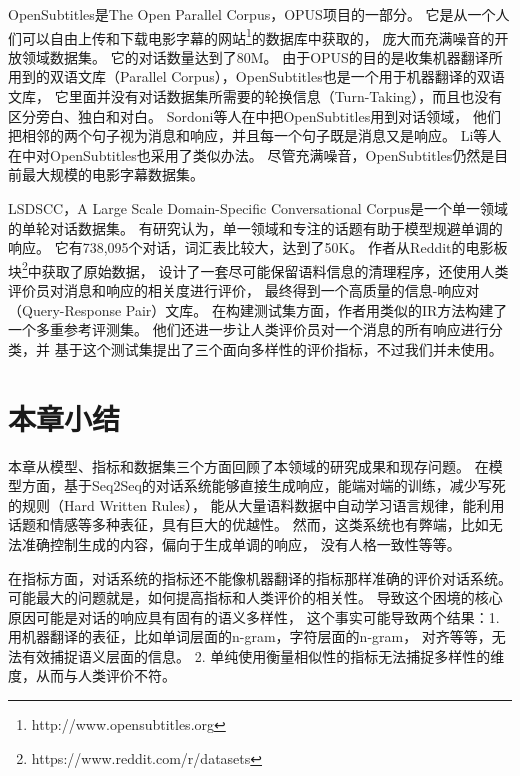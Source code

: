 OpenSubtitles是The Open Parallel Corpus，OPUS项目的一部分。
它是从一个人们可以自由上传和下载电影字幕的网站\footnote{http://www.opensubtitles.org}的数据库中获取的，
庞大而充满噪音的开放领域数据集。
它的对话数量达到了80M。
由于OPUS的目的是收集机器翻译所用到的双语文库（Parallel Corpus），OpenSubtitles也是一个用于机器翻译的双语文库，
它里面并没有对话数据集所需要的轮换信息（Turn-Taking），而且也没有区分旁白、独白和对白。
Sordoni等人在\cite{GoogleChatbot}中把OpenSubtitles用到对话领域，
他们把相邻的两个句子视为消息和响应，并且每一个句子既是消息又是响应。
Li等人在\cite{MMI,persona,Future,DiverseBeam,
Distill,deep_RL,Adversarial}中对OpenSubtitles也采用了类似办法。
尽管充满噪音，OpenSubtitles仍然是目前最大规模的电影字幕数据集。

LSDSCC，A Large Scale Domain-Specific Conversational Corpus是一个单一领域的单轮对话数据集。
有研究认为，单一领域和专注的话题有助于模型规避单调的响应。
它有738,095个对话，词汇表比较大，达到了50K。
作者从Reddit的电影板块\footnote{https://www.reddit.com/r/datasets}中获取了原始数据，
设计了一套尽可能保留语料信息的清理程序，还使用人类评价员对消息和响应的相关度进行评价，
最终得到一个高质量的信息-响应对（Query-Response Pair）文库。
在构建测试集方面，作者用类似\cite{DCGM}的IR方法构建了一个多重参考评测集。
他们还进一步让人类评价员对一个消息的所有响应进行分类，并
基于这个测试集提出了三个面向多样性的评价指标，不过我们并未使用。

\section{本章小结}\label{sec:rw_conclusion}
本章从模型、指标和数据集三个方面回顾了本领域的研究成果和现存问题。
在模型方面，基于Seq2Seq的对话系统能够直接生成响应，能端对端的训练，减少写死的规则（Hard Written Rules），
能从大量语料数据中自动学习语言规律，能利用话题和情感等多种表征，具有巨大的优越性。
然而，这类系统也有弊端，比如无法准确控制生成的内容，偏向于生成单调的响应，
没有人格一致性等等。

在指标方面，对话系统的指标还不能像机器翻译的指标那样准确的评价对话系统。
可能最大的问题就是，如何提高指标和人类评价的相关性。
导致这个困境的核心原因可能是对话的响应具有固有的语义多样性，
这个事实可能导致两个结果：1. 用机器翻译的表征，比如单词层面的n-gram，字符层面的n-gram，
对齐等等，无法有效捕捉语义层面的信息。
2. 单纯使用衡量相似性的指标无法捕捉多样性的维度，从而与人类评价不符。

